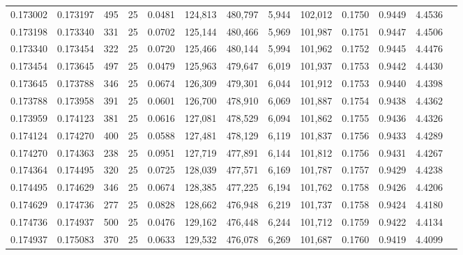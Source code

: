 \begin{tabular}{rrrrrrrrrrrrr}
0.173002 & 0.173197 &   495 &  25 &                                     0.0481 & 124,813 & 480,797 &   5,944 & 102,012 & 0.1750 & 0.9449 & 4.4536 \\
0.173198 & 0.173340 &   331 &  25 &                                     0.0702 & 125,144 & 480,466 &   5,969 & 101,987 & 0.1751 & 0.9447 & 4.4506 \\
0.173340 & 0.173454 &   322 &  25 &                                     0.0720 & 125,466 & 480,144 &   5,994 & 101,962 & 0.1752 & 0.9445 & 4.4476 \\
0.173454 & 0.173645 &   497 &  25 &                                     0.0479 & 125,963 & 479,647 &   6,019 & 101,937 & 0.1753 & 0.9442 & 4.4430 \\
0.173645 & 0.173788 &   346 &  25 &                                     0.0674 & 126,309 & 479,301 &   6,044 & 101,912 & 0.1753 & 0.9440 & 4.4398 \\
0.173788 & 0.173958 &   391 &  25 &                                     0.0601 & 126,700 & 478,910 &   6,069 & 101,887 & 0.1754 & 0.9438 & 4.4362 \\
0.173959 & 0.174123 &   381 &  25 &                                     0.0616 & 127,081 & 478,529 &   6,094 & 101,862 & 0.1755 & 0.9436 & 4.4326 \\
0.174124 & 0.174270 &   400 &  25 &                                     0.0588 & 127,481 & 478,129 &   6,119 & 101,837 & 0.1756 & 0.9433 & 4.4289 \\
0.174270 & 0.174363 &   238 &  25 &                                     0.0951 & 127,719 & 477,891 &   6,144 & 101,812 & 0.1756 & 0.9431 & 4.4267 \\
0.174364 & 0.174495 &   320 &  25 &                                     0.0725 & 128,039 & 477,571 &   6,169 & 101,787 & 0.1757 & 0.9429 & 4.4238 \\
0.174495 & 0.174629 &   346 &  25 &                                     0.0674 & 128,385 & 477,225 &   6,194 & 101,762 & 0.1758 & 0.9426 & 4.4206 \\
0.174629 & 0.174736 &   277 &  25 &                                     0.0828 & 128,662 & 476,948 &   6,219 & 101,737 & 0.1758 & 0.9424 & 4.4180 \\
0.174736 & 0.174937 &   500 &  25 &                                     0.0476 & 129,162 & 476,448 &   6,244 & 101,712 & 0.1759 & 0.9422 & 4.4134 \\
0.174937 & 0.175083 &   370 &  25 &                                     0.0633 & 129,532 & 476,078 &   6,269 & 101,687 & 0.1760 & 0.9419 & 4.4099 \\

\end{tabular}
